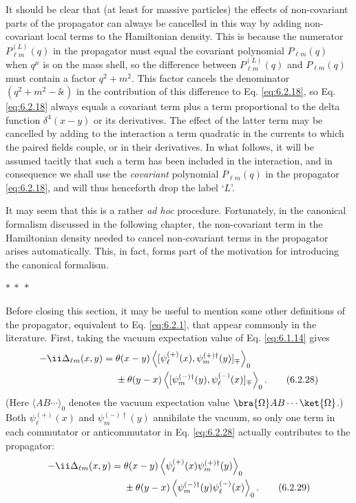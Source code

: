 It should be clear that (at least for massive particles) the effects of
non-covariant parts of the propagator can always be cancelled in this way by
adding non-covariant local terms to the Hamiltonian density. This is because
the numerator $P_{\ell m}^{(L)}(q)$ in the propagator must equal the covariant
polynomial $P_{\ell m}(q)$ when $q^\mu$ is on the mass shell, so the difference
between $P_{\ell m}^{(L)}(q)$ and $P_{\ell m}(q)$ must contain a factor
$q^2+m^2$. This factor cancels the denominator $(q^2+m^2-\ii\epsilon)$ in the
contribution of this difference to Eq. \eqref{eq:6.2.18}, so Eq. \eqref{eq:6.2.18} always equals
a covariant term plus a term proportional to the delta function
$\delta^4(x-y)$ or its derivatives. The effect of the latter term may be
cancelled by adding to the interaction a term quadratic in the currents to
which the paired fields couple, or in their derivatives. In what follows, it
will be assumed tacitly that such a term has been included in the interaction,
and in consequence we shall use the \emph{covariant} polynomial
$P_{\ell m}(q)$ in the propagator \eqref{eq:6.2.18}, and will thus henceforth drop the
label `$L$'.

It may seem that this is a rather \emph{ad hoc} procedure. Fortunately, in the
canonical formalism discussed in the following chapter, the non-covariant term
in the Hamiltonian density needed to cancel non-covariant terms in the
propagator arises automatically. This, in fact, forms part of the motivation
for introducing the canonical formalism.

\begin{center}
$*\ *\ *$
\end{center}

Before closing this section, it may be useful to mention some other definitions
of the propagator, equivalent to Eq. \eqref{eq:6.2.1}, that appear commonly in the
 literature. First, taking the vacuum expectation value of Eq. \eqref{eq:6.1.14} gives
\begin{align}
-\ii\Delta_{\ell m}(x,y)={}&\theta(x-y)
 \left\langle[\psi_\ell^{(+)}(x),\psi_m^{(+)\dagger}(y)]_{\mp}\right\rangle_0
\notag\\
&\mathbin{\pm}\theta(y-x)
 \left\langle[\psi_m^{(-)\dagger}(y),\psi_\ell^{(-)}(x)]_{\mp}\right\rangle_0.
\tag{6.2.28}
\label{eq:6.2.28}
\end{align}
(Here $\langle AB\cdots\rangle_0$ denotes the vacuum expectation value
$\bra{\Omega}AB\cdots\ket{\Omega}$.) Both $\psi_\ell^{(+)}(x)$ and
$\psi_m^{(-)\dagger}(y)$ annihilate the vacuum, so only one term in each
commutator or anticommutator in Eq. \eqref{eq:6.2.28} actually contributes to the
propagator:
\begin{align}
-\ii\Delta_{\ell m}(x,y)={}&\theta(x-y)
 \left\langle\psi_\ell^{(+)}(x)\psi_m^{(+)\dagger}(y)\right\rangle_0
\notag\\
&\mathbin{\pm}\theta(y-x)
 \left\langle\psi_m^{(-)\dagger}(y)\psi_\ell^{(-)}(x)\right\rangle_0.
\tag{6.2.29}
\label{eq:6.2.29}
\end{align}
